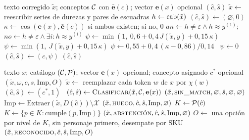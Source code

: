 \begin{algorithm}[htbp]
\caption{Clasificar un renglón (canal léxico y semántico)}
\label{alg:clasificar}
\begin{algorithmic}[1]
\Require texto corregido $\tilde x$; conceptos $\mathcal{C}$ con $\bar{\mathbf{e}}(c)$; vector $\mathbf{e}(x)$ opcional
\Ensure $(\hat c,\hat s)$
\State $\tilde x\gets$ reescribir series de durezas y pares de escuadras
\State $h\gets\operatorname{cab}(\tilde x)$ 
\State $(\hat c,\hat s)\gets(\varnothing,0)$
  \State $\kappa\gets\cos(\mathbf{e}(x),\bar{\mathbf{e}}(c))$ si ambos existen; si no, $0$
    \State $\mathit{an}\gets h\neq\varepsilon\wedge h\approx y^{(1)}$;\quad
           $\mathit{no}\gets h\neq\varepsilon\wedge\exists i: h\approx y^{(i)}$
     $\psi\gets\min(1,\ 0{,}6+0{,}4\,J(\tilde x,y)+0{,}15\,\kappa)$
     $\psi\gets\min(1,\ J(\tilde x,y)+0{,}15\,\kappa)$
     $\psi\gets0{,}55+0{,}4\,(\kappa-0{,}86)/0{,}14$
    \Else\ $\psi\gets0$
    \EndIf
     $(\hat c,\hat s)\gets(c,\psi)$ 
    \EndIf
  \EndFor
\EndFor
\State \Return $(\hat c,\hat s)$
\end{algorithmic}
\end{algorithm}

\begin{algorithm}[htbp]
\caption{Emparejar un renglón contra el catálogo}
\label{alg:emparejar}
\begin{algorithmic}[1]
\Require texto $x$; catálogo $(\mathcal{C},\mathcal{P})$; vector $\mathbf{e}(x)$ opcional; concepto asignado $c^\ast$ opcional
\Ensure $(\tilde x,\omega,c,s,\mathrm{Imp},O)$
\State $\tilde x\gets$ reemplazar cada token $w$ de $x$ por $\chi(w)$ 
 $(\hat c,\hat s)\gets(c^\ast,1)$
\Else\ $(\hat c,\hat s)\gets\textsc{Clasificar}(\tilde x,\mathcal{C},\mathbf{e}(x))$ 
\EndIf
{} \Return $(\tilde x,\textsc{sin\_match},\varnothing,\hat s,\varnothing,\varnothing)$ \EndIf
\State $\mathrm{Imp}\gets\mathrm{Extraer}(\tilde x,D(\hat c))\setminus\mathcal{X}$
 \Return $(\tilde x,\textsc{hueco},\hat c,\hat s,\mathrm{Imp},\varnothing)$ \EndIf
\State $K\gets\mathcal{P}(\hat c)$
  \State $K\gets\{p\in K : \mathrm{cumple}(p,\mathrm{Imp})\}$
   \Return $(\tilde x,\textsc{abstención},\hat c,\hat s,\mathrm{Imp},\varnothing)$ \EndIf
\EndIf
\State $O\gets$ una opción por nivel de $K$, sin personaje primero, desempate por SKU
\State \Return $(\tilde x,\textsc{reconocido},\hat c,\hat s,\mathrm{Imp},O)$
\end{algorithmic}
\end{algorithm}

